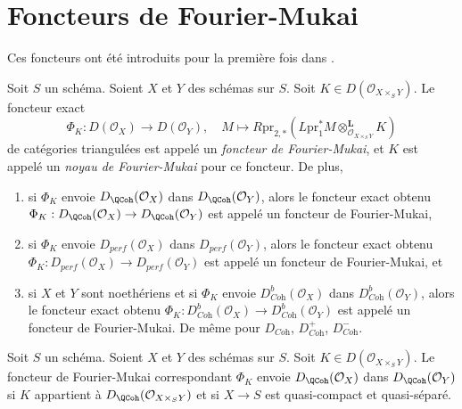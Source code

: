 \section{Foncteurs de Fourier-Mukai}
\label{section-fourier-mukai}

\noindent
Ces foncteurs ont été introduits pour la première fois dans \cite{Mukai}.

\begin{definition}
\label{definition-fourier-mukai-functor}
Soit $S$ un schéma. Soient $X$ et $Y$ des schémas sur $S$.
Soit $K \in D(\mathcal{O}_{X \times_S Y})$. Le foncteur exact
$$
\Phi_K : D(\mathcal{O}_X) \longrightarrow D(\mathcal{O}_Y),\quad
M \longmapsto R\text{pr}_{2, *}(
L\text{pr}_1^*M \otimes_{\mathcal{O}_{X \times_S Y}}^\mathbf{L} K)
$$
de catégories triangulées est appelé un {\it foncteur de Fourier-Mukai},
et $K$ est appelé un {\it noyau de Fourier-Mukai} pour ce foncteur.
De plus,
\begin{enumerate}
\item si $\Phi_K$ envoie $D_\QCoh(\mathcal{O}_X)$ dans $D_\QCoh(\mathcal{O}_Y)$,
alors le foncteur exact obtenu
$\Phi_K : D_\QCoh(\mathcal{O}_X) \to D_\QCoh(\mathcal{O}_Y)$
est appelé un foncteur de Fourier-Mukai,
\item si $\Phi_K$ envoie $D_{perf}(\mathcal{O}_X)$ dans
$D_{perf}(\mathcal{O}_Y)$, alors le foncteur exact obtenu
$\Phi_K : D_{perf}(\mathcal{O}_X) \to D_{perf}(\mathcal{O}_Y)$
est appelé un foncteur de Fourier-Mukai, et
\item si $X$ et $Y$ sont noethériens et si $\Phi_K$ envoie
$D^b_{\textit{Coh}}(\mathcal{O}_X)$ dans $D^b_{\textit{Coh}}(\mathcal{O}_Y)$,
alors le foncteur exact obtenu
$\Phi_K : D^b_{\textit{Coh}}(\mathcal{O}_X) \to
D^b_{\textit{Coh}}(\mathcal{O}_Y)$
est appelé un foncteur de Fourier-Mukai.
De même pour $D_{\textit{Coh}}$, $D^+_{\textit{Coh}}$, $D^-_{\textit{Coh}}$.
\end{enumerate}
\end{definition}

\begin{lemma}
\label{lemma-fourier-Mukai-QCoh}
Soit $S$ un schéma. Soient $X$ et $Y$ des schémas sur $S$.
Soit $K \in D(\mathcal{O}_{X \times_S Y})$.
Le foncteur de Fourier-Mukai correspondant $\Phi_K$ envoie
$D_\QCoh(\mathcal{O}_X)$ dans $D_\QCoh(\mathcal{O}_Y)$
si $K$ appartient à $D_\QCoh(\mathcal{O}_{X \times_S Y})$ et si $X \to S$ est
quasi-compact et quasi-séparé.
\end{lemma}

